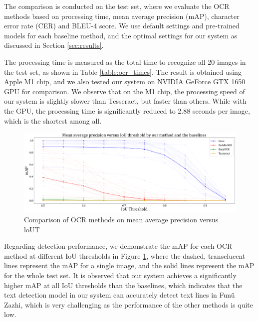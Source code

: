 \documentclass[12pt,twoside]{report}
\begin{document}
The comparison is conducted on the test set, where we evaluate the OCR methods based on processing time, mean average precision (mAP), character error rate (CER) and BLEU-4 score. We use default settings and pre-trained models for each baseline method, and the optimal settings for our system as discussed in Section \ref{sec:results}.

The processing time is measured as the total time to recognize all 20 images in the test set, as shown in Table \ref{table:ocr_times}. The result is obtained using Apple M1 chip, and we also tested our system on NVIDIA GeForce GTX 1650 GPU for comparison. We observe that on the M1 chip, the processing speed of our system is slightly slower than Tesseract, but faster than others. While with the GPU, the processing time is significantly reduced to 2.88 seconds per image, which is the shortest among all.

\begin{figure}[htbp]
    \centering
    \includegraphics[width=\textwidth]{./figures/comp_map1.png}
    \caption{Comparison of OCR methods on mean average precision versus loUT}
    \label{fig:comp_map1}
\end{figure}

Regarding detection performance, we demonstrate the mAP for each OCR method at different IoU thresholds in Figure \ref{fig:comp_map1}, where the dashed, transclucent lines represent the mAP for a single image, and the solid lines represent the mAP for the whole test set. It is observed that our system achieves a significantly higher mAP at all IoU thresholds than the baselines, which indicates that the text detection model in our system can accurately detect text lines in Funü Zazhi, which is very challenging as the performance of the other methods is quite low.
\end{document}
